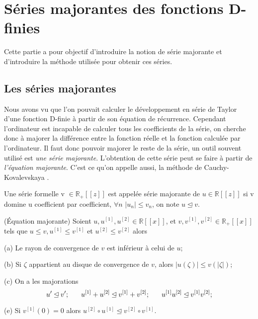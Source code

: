 \documentclass[a4paper,10pt]{article}
\begin{document}
	
	
	\section{Séries majorantes des fonctions D-finies}
	\label{sec:serie-maj}
	Cette partie a pour objectif d'introduire la notion de série majorante et d'introduire la méthode utilisée pour obtenir ces séries.
	
	\subsection{Les séries majorantes}
	Nous avons vu que l'on pouvait calculer le développement en série de Taylor d'une fonction D-finie à partir de son équation de récurrence. Cependant l'ordinateur est incapable de calculer tous les coefficients de la série, on cherche donc à majorer la différence entre la fonction réelle et la fonction calculée par l'ordinateur. Il faut donc pouvoir majorer le reste de la série, un outil souvent utilisé est \textit{une série majorante}. L'obtention de cette série peut se faire à partir de \textit{l'équation majorante}. C'est ce qu'on appelle aussi, la méthode de Cauchy-Kovalevskaya \cite{van2001fast}.
	
	\begin{definition} Une série formelle v $\in \mathbb{R}_{+}[[z]]$ est appelée série majorante de $ u \in \mathbb{R}[[z]]$ si v domine u coefficient par coefficient, $\forall n$ $ |u_{n}|\leq v_{n}$, on note $u \unlhd v$.
	\end{definition}
	
	\begin{proposition}(Équation majorante) Soient $u,u^{[1]},u^{[2]}\in \mathbb{R}[[x]]$, et $v,v^{[1]},v^{[2]} \in \mathbb{R}_{+}[[x]]$ tels que $u\leq v,u^{[1]}\leq v^{[1]}$ et $u^{[2]}\leq v^{[2]}$ alors
		
		(a) Le rayon de convergence de $v$ est inférieur à celui de $u$;
		
		(b) Si $\zeta$ appartient au disque de convergence de $v$, alors $|u(\zeta)|\leq v(|\zeta|)$;
		
		(c) On a les majorations
		\[u' \unlhd v'; \hspace{6mm} u^{[1]}+u^{[2]}\unlhd v^{[1]}+v^{[2]}; \hspace{6mm}u^{[1]}u^{[2]}\unlhd v^{[1]}v^{[2]}; \]
		
		(e) Si $v^{[1]}(0)=0$ alors $ u^{[2]} \circ u^{[1]} \unlhd v^{[2]}\circ v^{[1]}$.
	\end{proposition}
\end{document}
